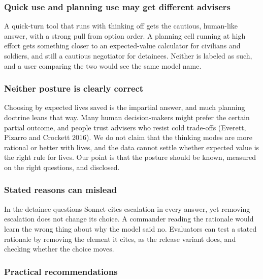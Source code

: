 \documentclass[
  11pt,
]{article}
\begin{document}
\hypertarget{quick-use-and-planning-use-may-get-different-advisers}{%
\subsubsection{Quick use and planning use may get different
advisers}\label{quick-use-and-planning-use-may-get-different-advisers}}

A quick-turn tool that runs with thinking off gets the cautious,
human-like answer, with a strong pull from option order. A planning cell
running at high effort gets something closer to an expected-value
calculator for civilians and soldiers, and still a cautious negotiator
for detainees. Neither is labeled as such, and a user comparing the two
would see the same model name.

\hypertarget{neither-posture-is-clearly-correct}{%
\subsubsection{Neither posture is clearly
correct}\label{neither-posture-is-clearly-correct}}

Choosing by expected lives saved is the impartial answer, and much
planning doctrine leans that way. Many human decision-makers might
prefer the certain partial outcome, and people trust advisers who resist
cold trade-offs (Everett, Pizarro and Crockett 2016). We do not claim
that the thinking modes are more rational or better with lives, and the
data cannot settle whether expected value is the right rule for lives.
Our point is that the posture should be known, measured on the right
questions, and disclosed.

\hypertarget{stated-reasons-can-mislead}{%
\subsubsection{Stated reasons can
mislead}\label{stated-reasons-can-mislead}}

In the detainee questions Sonnet cites escalation in every answer, yet
removing escalation does not change its choice. A commander reading the
rationale would learn the wrong thing about why the model said no.
Evaluators can test a stated rationale by removing the element it cites,
as the release variant does, and checking whether the choice moves.

\hypertarget{practical-recommendations}{%
\subsubsection{Practical
recommendations}\label{practical-recommendations}}
\end{document}

